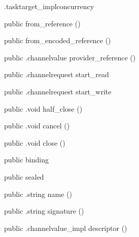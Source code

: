 \begin{CrexxClass}{.tasktarget\_impl}{concurrency}
\begin{Members}
    \Factory
      {public}
      {from\_reference}
      {()}

    \Factory
      {public}
      {from\_encoded\_reference}
      {()}

    \Method
      {public}
      {.channelvalue}
      {provider\_reference}
      {()}

    \Method
      {public}
      {.channelrequest}
      {start\_read}
      {}

    \Method
      {public}
      {.channelrequest}
      {start\_write}
      {}

    \Method
      {public}
      {.void}
      {half\_close}
      {()}

    \Method
      {public}
      {.void}
      {cancel}
      {()}

    \Method
      {public}
      {.void}
      {close}
      {()}

    \Factory
      {public}
      {binding}
      {}

    \Factory
      {public}
      {sealed}
      {}

    \Method
      {public}
      {.string}
      {name}
      {()}

    \Method
      {public}
      {.string}
      {signature}
      {()}

    \Method
      {public}
      {.channelvalue\_impl}
      {descriptor}
      {()}

  \end{Members}
\end{CrexxClass}

